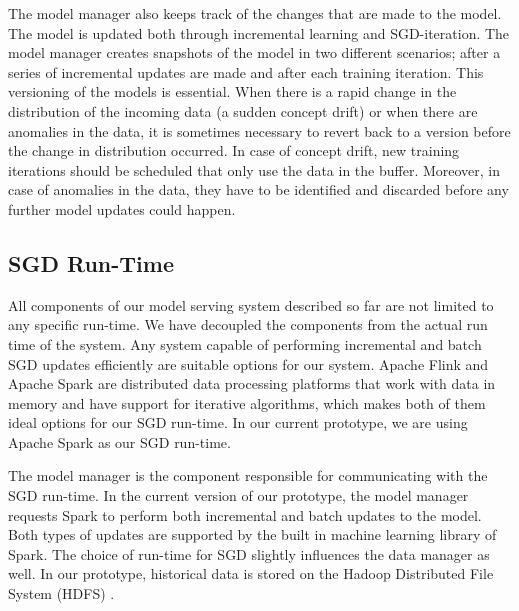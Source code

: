 The model manager also keeps track of the changes that are made to the model.
The model is updated both through incremental learning and SGD-iteration.
The model manager creates snapshots of the model in two different scenarios; after a series of incremental updates are made and after each training iteration.
This versioning of the models is essential.
When there is a rapid change in the distribution of the incoming data (a sudden concept drift) or when there are anomalies in the data, it is sometimes necessary to revert back to a version before the change in distribution occurred.
In case of concept drift, new training iterations should be scheduled that only use the data in the buffer.
Moreover, in case of anomalies in the data, they have to be identified and discarded before any further model updates could happen.

\subsection{SGD Run-Time} 
All components of our model serving system described so far are not limited to any specific run-time.
We have decoupled the components from the actual run time of the system.
Any system capable of performing incremental and batch SGD updates efficiently are suitable options for our system.
Apache Flink \cite{carbone2015apache} and Apache Spark \cite{zaharia2010spark} are distributed data processing platforms that work with data in memory and have support for iterative algorithms, which makes both of them ideal options for our SGD run-time.
In our current prototype, we are using Apache Spark \cite{zaharia2010spark} as our SGD run-time.

The model manager is the component responsible for communicating with the SGD run-time.
In the current version of our prototype, the model manager requests Spark to perform both incremental and batch updates to the model.
Both types of updates are supported by the built in machine learning library of Spark.
The choice of run-time for SGD slightly influences the data manager as well.
In our prototype, historical data is stored on the Hadoop Distributed File System (HDFS) \cite{shvachko2010hadoop}.


